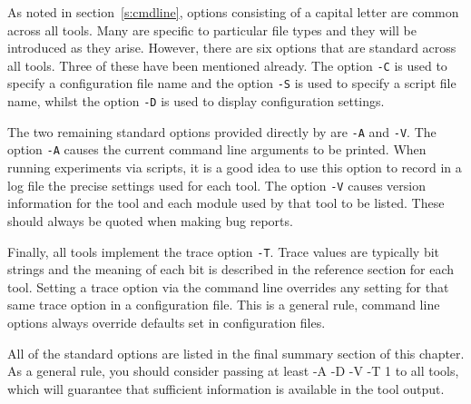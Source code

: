 
 As noted in section~\ref{s:cmdline}, options
consisting of a capital letter are common across all tools.  Many are
specific to particular file types and they will be introduced as they
arise.  However, there are six options that are standard across all
tools.  Three of these have been mentioned already.  The
option \texttt{-C} is used to
specify a configuration file name and the option
\texttt{-S} is used to
specify a script file name, whilst the option
\texttt{-D} is used to
display configuration settings.

The two remaining standard options provided directly by 
 are \texttt{-A}
and \texttt{-V}. 
The option \texttt{-A} causes the current command line arguments to 
be printed. When running experiments via
scripts, it is a good idea to use this option to record in a log file the
precise settings used for each tool.
The option \texttt{-V}
causes version information for the tool and each module used by that
tool to be listed.  These should always be quoted when making bug reports.

Finally, all tools implement the trace 
option \texttt{-T}.
Trace values are typically bit strings and the meaning of each bit
is described in the reference section for each tool.  Setting a trace
option via the command line overrides any setting for that same trace
option in a configuration file.  This is a general rule, command line
options always override defaults set in configuration files.

All of the standard options are listed in the final summary section of
this chapter. As a general rule, you should consider passing at least
-A -D -V -T 1 to all tools, which will guarantee that sufficient
information is available in the tool output.



